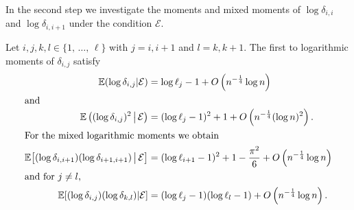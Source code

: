 \documentclass[AHL,Unicode,longabstracts,published]{cedram}
\newcommand{\bbE}{\mathbb{E}}
\newcommand{\clE}{\mathcal{E}}
\begin{document}
In the second step we investigate the moments and mixed moments of $\log \delta_{i,i}$ and $\log \delta_{i,i+1}$ under the condition $\clE$.

\begin{lemm}\label{lm:distancesmall}
Let $i,j,k,l\in\{1,\,\ldots,\,\ell\}$ with $j=i,i+1$ and $l=k,k+1$. The first to logarithmic moments of $\delta_{i,j}$ satisfy
\begin{align}
\bbE (\log \delta_{i,j} |\clE) &=\log \ell_j -1 + O\left(n^{- \frac 14} \log n\right)\label{eq:E-log-delta}\\
\intertext{and}
\bbE \left((\log \delta_{i,j})^2 \,\middle|\,\clE\right) &=(\log \ell_j-1)^2 + 1 +O\left(n^{- \frac 14}(\log n)^2\right).\label{eq:E-log-delta-sqr}\\
\intertext{For the mixed logarithmic moments we obtain}
\bbE\big[(\log \delta_{i,i+1}) (\log \delta_{i+1,i+1})\,\big|\,\clE\big] &= (\log \ell_{i+1} -1)^2 + 1- \frac {\pi^2}6 + O\left(n^{- \frac 14} \log n\right)
\label{eq:E-log-delta-neighbors}\\
\intertext{and for $j \neq l$,}
\bbE[(\log \delta_{i,j}) (\log \delta_{k,l})|\clE]& = (\log \ell_{j} -1)(\log \ell_{l} -1) + O\left(n^{- \frac 14} \log n\right).
\label{eq:E-log-delta-nonneighbors}
\end{align}
\end{lemm}
\end{document}
